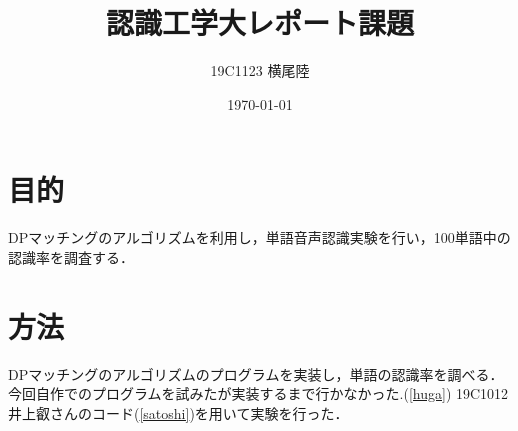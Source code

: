 \documentclass[dvipdfmx]{jsarticle}
\begin{document}
\title{認識工学大レポート課題}
\author{19C1123 横尾陸}
\date{\today}
\maketitle

\section{目的}
DPマッチングのアルゴリズムを利用し，単語音声認識実験を行い，100単語中の認識率を調査する．

\section{方法}
DPマッチングのアルゴリズムのプログラムを実装し，単語の認識率を調べる．
今回自作でのプログラムを試みたが実装するまで行かなかった.(\ref{huga})
19C1012井上叡さんのコード(\ref{satoshi})を用いて実験を行った．
\end{document}
